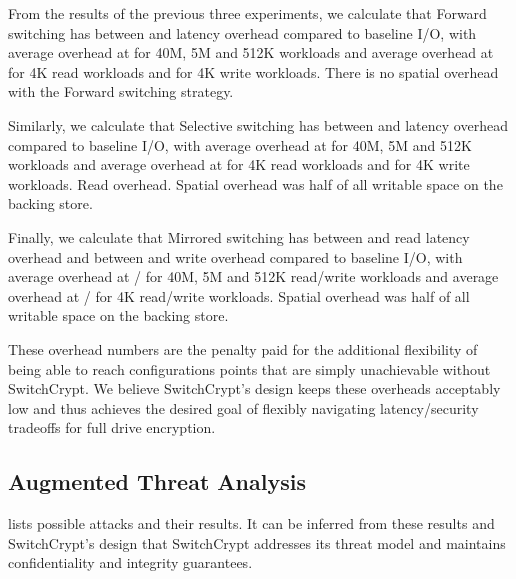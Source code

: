 From the results of the previous three experiments, we calculate that Forward
switching has between  and  latency overhead compared to
baseline I/O, with average overhead at  for 40M, 5M and 512K workloads
and average overhead at  for 4K read workloads and  for 4K
write workloads. There is no spatial overhead with the Forward switching
strategy.

Similarly, we calculate that Selective switching has between  and
 latency overhead compared to baseline I/O, with average overhead at
 for 40M, 5M and 512K workloads and average overhead at  for
4K read workloads and  for 4K write workloads. Read overhead. Spatial
overhead was half of all writable space on the backing store.

Finally, we calculate that Mirrored switching has between  and 
read latency overhead and between  and  write overhead compared
to baseline I/O, with average overhead at / for 40M, 5M and
512K read/write workloads and average overhead at / for 4K
read/write workloads. Spatial overhead was half of all writable space on the
backing store.

These overhead numbers are the penalty paid for the additional flexibility of being able to 
reach configurations points that are simply unachievable without SwitchCrypt.  We believe SwitchCrypt's design keeps these overheads acceptably low and thus achieves the desired goal of flexibly navigating latency/security tradeoffs for full drive encryption.

\subsection{Augmented Threat Analysis}

 lists possible attacks and their results. It can be inferred
from these results and SwitchCrypt's design that SwitchCrypt addresses its
threat model and maintains confidentiality and integrity guarantees.

